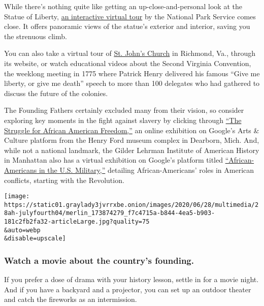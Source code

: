 While there's nothing quite like getting an up-close-and-personal look
at the Statue of Liberty,
\href{https://www.nps.gov/stli/learn/photosmultimedia/virtualtour.htm}{an
interactive virtual tour} by the National Park Service comes close. It
offers panoramic views of the statue's exterior and interior, saving you
the strenuous climb.

You can also take a virtual tour of
\href{https://www.historicstjohnschurch.org/virtual-tour}{St. John's
Church} in Richmond, Va., through its website, or watch educational
videos about the Second Virginia Convention, the weeklong meeting in
1775 where Patrick Henry delivered his famous ``Give me liberty, or give
me death'' speech to more than 100 delegates who had gathered to discuss
the future of the colonies.

The Founding Fathers certainly excluded many from their vision, so
consider exploring key moments in the fight against slavery by clicking
through
\href{https://artsandculture.google.com/exhibit/the-struggle-for-african-american-freedom-the-henry-ford/mgIi-GjK9Fx4KA?hl=en}{``The
Struggle for African American Freedom,''} an online exhibition on
Google's Arts \& Culture platform from the Henry Ford museum complex in
Dearborn, Mich. And, while not a national landmark, the Gilder Lehrman
Institute of American History in Manhattan also has a virtual exhibition
on Google's platform titled
\href{https://artsandculture.google.com/exhibit/african-americans-in-the-us-military-from-the-revolution-to-the-world-wars/DgJiYQ9uBRWnIw}{``African-Americans
in the U.S. Military,''} detailing African-Americans' roles in American
conflicts, starting with the Revolution.

\texttt{[image: https://static01.graylady3jvrrxbe.onion/images/2020/06/28/multimedia/28ah-julyfourth04/merlin\_173874279\_f7c4715a-b844-4ea5-b903-181c2fb2fa32-articleLarge.jpg?quality=75\\\&auto=webp\\\&disable=upscale]}

\hypertarget{watch-a-movie-about-the-countrys-founding}{%
\subsubsection{Watch a movie about the country's
founding.}\label{watch-a-movie-about-the-countrys-founding}}

If you prefer a dose of drama with your history lesson, settle in for a
movie night. And if you have a backyard and a projector, you can set up
an outdoor theater and catch the fireworks as an intermission.

